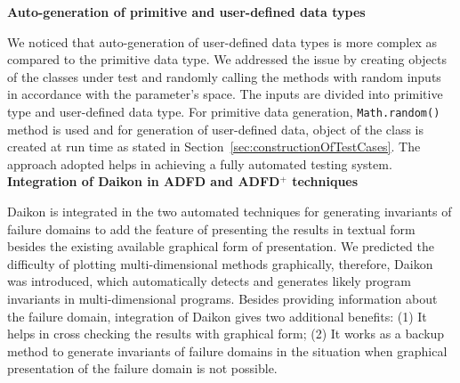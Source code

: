 \textbf{Auto-generation of primitive and user-defined data types}

We noticed that auto-generation of user-defined data types is more complex as compared to the primitive data type. We addressed the issue by creating objects of the classes under test and randomly calling the methods with random inputs in accordance with the parameter's space. The inputs are divided into primitive type and user-defined data type.  For primitive data generation, \verb+Math.random()+ method is used and for generation of user-defined data, object of the class is created at run time as stated in Section~\ref{sec:constructionOfTestCases}. The approach adopted helps in achieving a fully automated testing system.\\








\textbf{Integration of Daikon in ADFD and ADFD$^+$ techniques}

Daikon is integrated in the two automated techniques for generating invariants of failure domains to add the feature of  presenting the results in textual form besides the existing available graphical form of presentation. We predicted the difficulty of plotting multi-dimensional methods graphically, therefore, Daikon was introduced, which automatically detects and generates likely program invariants in multi-dimensional programs. Besides providing information about the failure domain, integration of Daikon gives two additional benefits: (1) It helps in cross checking the results with graphical form; (2) It works as a backup method to generate invariants of failure domains in the situation when graphical presentation of the failure domain is not possible. \\
\clearpage



